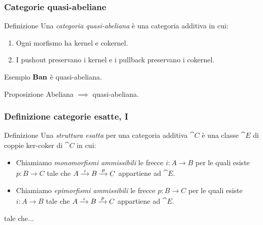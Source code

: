 \documentclass{beamer}
\begin{document}
\begin{frame}[fragile]
  \frametitle{Categorie quasi-abeliane}

  \begin{block}{Definizione}
    Una {\em categoria quasi-abeliana} è una categoria additiva in cui:
    \begin{enumerate}
    \item Ogni morfismo ha kernel e cokernel.
    \item I pushout preservano i kernel e i pullback preservano i cokernel.
    \end{enumerate}
  \end{block}

  \begin{block}{Esempio}
    \(\mathbf{Ban}\) è quasi-abeliana.
  \end{block}

  \begin{block}{Proposizione}
    Abeliana \(\implies\) quasi-abeliana.
  \end{block}
  
\end{frame}

\begin{frame}[fragile]
  \frametitle{Definizione categorie esatte, I}

  \begin{block}{Definizione}
    Una {\em struttura esatta} per una categoria additiva \(\cat C\) è una
  classe \(\cat E\) di coppie ker-coker di \(\cat C\) in cui:
  \begin{itemize}
  \item Chiamiamo {\em monomorfismi ammissibili} le frecce
    \(i : A \to B\) per le quali esiste \(p : B \to C\) tale che
    \(\begin{tikzcd}[column sep=small, cramped] A \ar["{i}", r] & B
      \ar["{p}", r] & C \end{tikzcd}\) appartiene ad \(\cat E\).
  \item Chiamiamo {\em epimorfismi ammissibili} le frecce
    \(p : B \to C\) per le quali esiste \(i : A \to B\) tale che
    \(\begin{tikzcd}[column sep=small, cramped] A \ar["{i}", r] & B
      \ar["{p}", r] & C \end{tikzcd}\) appartiene ad \(\cat E\).
  \end{itemize}
  tale che...
  \end{block}
  
\end{frame}
\end{document}
